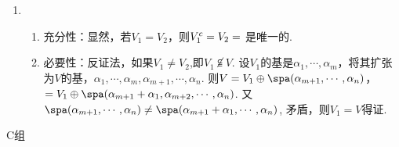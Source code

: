 \begin{enumerate}
    \item \begin{enumerate}
        \item 充分性：显然，若$V_1=V_2$，则$V_1^c=V_2=\empty$ 是唯一的.
        \item 必要性：反证法，如果$V_1\ne V_2$,即$V_1\not\subseteqq V$. 设$V_1$的基是$\alpha_1,\cdots ,\alpha_m$，将其扩张为$V$的基，$\alpha_1,\cdots  ,\alpha_m,\alpha_{m+1},\cdots ,\alpha_n$. 则$V=V_1\oplus \spa(\alpha_{m+1},\cdots ,\alpha_n)$，$=V_1\oplus \spa(\alpha_{m+1}+\alpha_ 1,\alpha_{m+2},\cdots ,\alpha_n)$. 又$\spa(\alpha_{m+1},\cdots ,\alpha_n)\ne \spa(\alpha_{m+1}+\alpha_1,\cdots,\alpha_n)$, 矛盾，则$V_1=V$得证.
    \end{enumerate}
\end{enumerate}

\centerline{\heiti C组}
